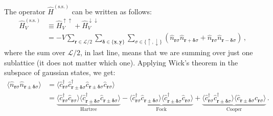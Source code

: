 The operator $\hat H^{(\mathrm{s.s.})}$ can be written as follows:
\begin{align}
	\hat H_V^{(\mathrm{s.s.})} &\equiv \hat H_V^{\uparrow\uparrow}  + \hat H_V^{\downarrow\downarrow} \nonumber \\
	&= -V \sum_{\mathbf{r} \in \mathcal{L}/2} \sum_{\bm{\delta}\in \lbrace \underline{\mathbf{x}}, \underline{\mathbf{y}} \rbrace} \sum_{\sigma \in \lbrace \uparrow, \downarrow \rbrace} \left(
	\hat n_{\mathbf{r}\sigma} \hat n_{\mathbf{r}+\bm{\delta} \sigma} + \hat n_{\mathbf{r}\sigma} \hat n_{\mathbf{r}-\bm{\delta}\sigma}
	\right) \, , \label{eq:ehm-HV(ss)}
\end{align}
where the sum over $\mathcal{L}/2$, in last line, means that we are summing over just one sublattice (it does not matter which one). Applying Wick's theorem in the subspace of gaussian states, we get:
\begin{align}
	\langle 
	\hat n_{\mathbf{r}\sigma} \hat n_{\mathbf{r} \pm \bm{\delta} \sigma}
	\rangle &= \langle
	\hat c_{\mathbf{r}\sigma}^\dagger \hat c_{\mathbf{r} \pm \bm{\delta} \sigma}^\dagger \hat c_{\mathbf{r} \pm \bm{\delta} \sigma} \hat c_{\mathbf{r}\sigma}
	\rangle \nonumber \\
	&=
	\underbrace{
		\langle 
		\hat c_{\mathbf{r}\sigma}^\dagger \hat c_{\mathbf{r}\sigma}
		\rangle \langle	
		\hat c_{\mathbf{r} \pm \bm{\delta} \sigma}^\dagger \hat c_{\mathbf{r} \pm \bm{\delta} \sigma}
		\rangle
	}_{\text{Hartree}}
	- 
	\underbrace{
		\langle 
		\hat c_{\mathbf{r}\sigma}^\dagger \hat c_{\mathbf{r} \pm \bm{\delta} \sigma}
		\rangle \langle	
		\hat c_{\mathbf{r} \pm \bm{\delta} \sigma}^\dagger \hat c_{\mathbf{r}\sigma}
		\rangle 
	}_{\text{Fock}}
	+
	\underbrace{
		\langle 
		\hat c_{\mathbf{r}\sigma}^\dagger \hat c_{\mathbf{r} \pm \bm{\delta} \sigma}^\dagger
		\rangle \langle	
		\hat c_{\mathbf{r} \pm \bm{\delta} \sigma} \hat c_{\mathbf{r}\sigma}
		\rangle 
	}_{\text{Cooper}}	
	\label{eq:ehm-HV(ss)-wick} \, .
\end{align}

